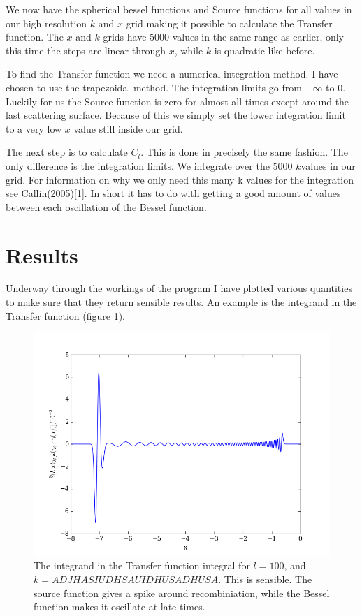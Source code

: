 \documentclass[a4paper]{report}
\begin{document}
We now have the spherical bessel functions and Source functions for all values in our high resolution $k$ and $x$ grid making it possible to calculate the Transfer function. The $x$ and $k$ grids have $5000$ values in the same range as earlier, only this time the steps are linear through $x$, while $k$ is quadratic like before.

To find the Transfer function we need a numerical integration method. I have chosen to use the trapezoidal method. The integration limits go from $-\infty$ to $0$. Luckily for us the Source function is zero for almost all times except around the last scattering surface. Because of this we simply set the lower integration limit to a very low $x$ value still inside our grid.

The next step is to calculate $C_l$. This is done in precisely the same fashion. The only difference is the integration limits. We integrate over the $5000$ $k$values in our grid. For information on why we only need this many k values for the integration see Callin(2005)[1]. In short it has to do with getting a good amount of values between each oscillation of the  Bessel function. 



\section{Results}\label{sec:results}

Underway through the workings of the program I have plotted various quantities to make sure that they return sensible results. An example is the integrand in the Transfer function (figure \ref{fig:integrand}).

\begin{figure}[ht]
 \includegraphics[width=\textwidth]{integrand.png}
 \caption{The integrand in the Transfer function integral for $l= 100$, and $k = ADJHASIUDHSAUIDHUSADHUSA$. This is sensible. The source function gives a spike around recombiniation, while the Bessel function makes it oscillate at late times.}
 \label{fig:integrand}
\end{figure}
\end{document}
